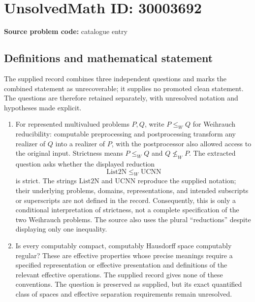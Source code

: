 \documentclass[11pt]{article}
\begin{document}
\section*{UnsolvedMath ID: 30003692}
\textbf{Source problem code:} catalogue entry
\subsection{Definitions and mathematical statement}
The supplied record combines three independent questions and marks the combined statement as unrecoverable; it supplies no promoted clean statement. The questions are therefore retained separately, with unresolved notation and hypotheses made explicit.

\begin{enumerate}
\item For represented multivalued problems \(P,Q\), write \(P\leq_W Q\) for Weihrauch reducibility: computable preprocessing and postprocessing transform any realizer of \(Q\) into a realizer of \(P\), with the postprocessor also allowed access to the original input. Strictness means \(P\leq_W Q\) and \(Q\not\leq_W P\). The extracted question asks whether the displayed reduction
\[
\mathrm{List2N}\leq_W\mathrm{UCNN}
\]
is strict. The strings \(\mathrm{List2N}\) and \(\mathrm{UCNN}\) reproduce the supplied notation; their underlying problems, domains, representations, and intended subscripts or superscripts are not defined in the record. Consequently, this is only a conditional interpretation of strictness, not a complete specification of the two Weihrauch problems. The source also uses the plural ``reductions'' despite displaying only one inequality.

\item Is every computably compact, computably Hausdorff space computably regular? These are effective properties whose precise meanings require a specified representation or effective presentation and definitions of the relevant effective operations. The supplied record gives none of these conventions. The question is preserved as supplied, but its exact quantified class of spaces and effective separation requirements remain unresolved.


\end{enumerate}
\end{document}
